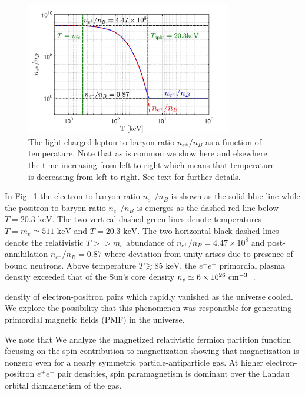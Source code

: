 \documentclass[a4paper]{article}
\newcommand*{\keV}{\text{ keV}}
\newcommand{\rf}[1]{Fig.~{\ref{#1}}}
\begin{document}
\begin{figure}[ht]
    \centering
    \includegraphics[width=0.8\textwidth]{EEPlasmaDensityRatio_new.jpg}
    \caption{The light charged lepton-to-baryon ratio $n_{e^{\pm}}/n_{B}$  as a function of temperature. Note that as is common we show here and elsewhere the time increasing from left to right which means that temperature is decreasing from left to right. See text for further details.}
    \label{fig:densityratio} 
\end{figure}

In \rf{fig:densityratio} the electron-to-baryon ratio $n_{e^{-}}/n_{B}$ is shown as the solid blue line while the positron-to-baryon ratio $n_{e^{+}}/n_{B}$ is emerges as the dashed red line below $T=20.3\keV$. The two vertical dashed green lines denote temperatures $T=m_{e}\simeq511\keV$ and $T=20.3\keV$. The two horizontal black dashed lines denote the relativistic $T>>m_e$ abundance of $n_{e^{\pm}}/n_{B}=4.47\times10^{8}$ and post-annihilation  $n_{e^{-}}/n_{B}=0.87$ where deviation from unity arises due to presence of bound neutrons. Above temperature $T\gtrsim85\keV$, the $e^{+}e^{-}$ primordial plasma density exceeded that of the Sun's core density $n_{e}\simeq6\times10^{26}{\rm\ cm}^{-3}$~\cite{bahcall2001solar}. 



density of electron-positron pairs which rapidly vanished as the universe cooled. We explore the possibility that this phenomenon was responsible for generating primordial magnetic fields (PMF) in the universe. 

We note that We analyze the magnetized relativistic fermion partition function focusing on the spin contribution to magnetization showing that magnetization is nonzero even for a nearly symmetric particle-antiparticle gas. At higher electron-positron $e^{+}e^{-}$ pair densities, spin paramagnetism is dominant over the Landau orbital diamagnetism of the gas.
\end{document}
